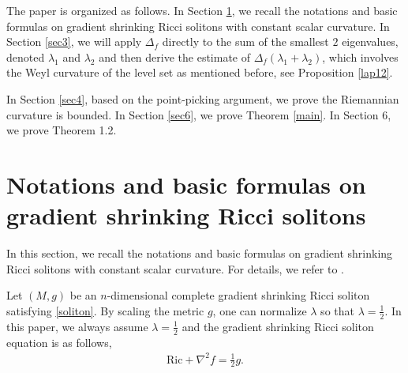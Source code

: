 \documentclass[12pt]{amsart}
\begin{document}
	
	The paper is organized as follows.
	In Section \ref{sec2}, we recall the notations and basic formulas on gradient shrinking Ricci solitons with constant scalar curvature.
	In Section \ref{sec3}, we will apply $\Delta_f$ directly to the sum of the smallest $2$ eigenvalues, denoted $\lambda_1$ and $\lambda_2$ and then derive the estimate of $\Delta_f(\lambda_1+\lambda_2)$,  which involves the Weyl curvature of the level set as mentioned before, see Proposition \ref{lap12}.
	
	In Section \ref{sec4}, based on the point-picking argument, we prove the Riemannian curvature is bounded.
	In Section \ref{sec6}, we prove Theorem \ref{main}.
      In Section 6, we prove Theorem 1.2.
	
	\smallskip
	
	
	
	\section{Notations and basic formulas on gradient shrinking Ricci solitons}\label{sec2}
	
	In this section, we recall the notations and basic formulas on gradient shrinking Ricci solitons with constant scalar curvature. For details, we refer to \cite{Cao,Hamilton,Petersen-Wylie,Cheng-Zhou}.
	
	\smallskip
	Let  $(M, g)$ be an $n$-dimensional complete gradient shrinking Ricci soliton satisfying \eqref{soliton}.
	By scaling the metric $g$,  one can normalize $\lambda$ so that $\lambda=\frac{1}{2}$. In this paper, we always assume $\lambda=\frac{1}{2}$ and the gradient shrinking Ricci soliton equation is as follows,
	\begin{align}\label{soliton'}
	\text{Ric}+\nabla^2f=\frac{1}{2} g.
	\end{align}
	
\end{document}
